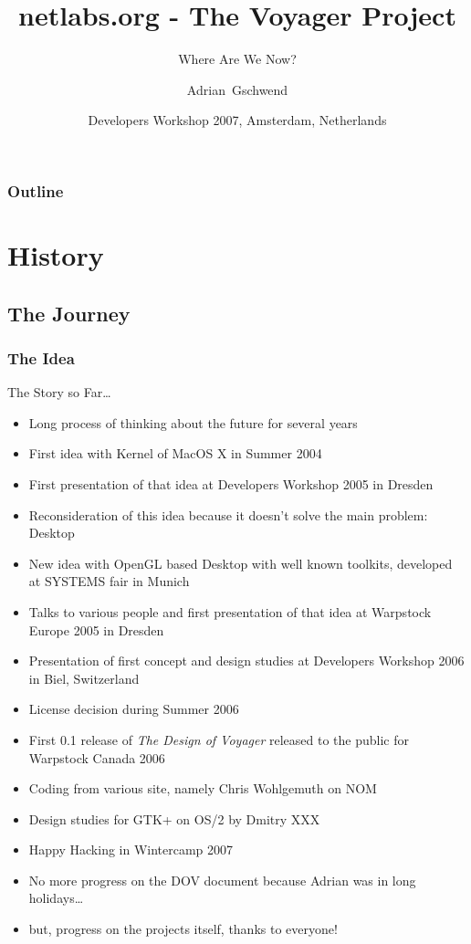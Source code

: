 \documentclass{beamer}
\title[netlabs.org - The Voyager Project]
{netlabs.org - The Voyager Project}
\subtitle
{Where Are We Now?}
\author[Adrian Gschwend]
{Adrian~Gschwend}
\institute[netlabs.org]
{
netlabs.org - Open Source Software
}
\date[07.07.2007]
{Developers Workshop 2007, Amsterdam, Netherlands}
\begin{document}
\begin{frame}
\titlepage
\end{frame}

\begin{frame}
\frametitle{Outline}
\tableofcontents[hideallsubsections]
\end{frame}

\section{History}

\subsection{The Journey}
\begin{frame}[allowframebreaks=0.6]
\frametitle{The Idea}
The Story so Far\ldots
\begin{itemize}
  \item Long process of thinking about the future for several years
  \item First idea with Kernel of MacOS X in Summer 2004
  \item First presentation of that idea at Developers Workshop 2005 in Dresden
  \item Reconsideration of this idea because it doesn't solve the main problem: Desktop
  \item New idea with OpenGL based Desktop with well known toolkits, developed at SYSTEMS fair in Munich
  \item Talks to various people and first presentation of that idea at
  Warpstock Europe 2005 in Dresden
  \item Presentation of first concept and design studies at Developers
  Workshop 2006 in Biel, Switzerland
  \item License decision during Summer 2006
  \item First 0.1 release of \textit{The Design of Voyager} released to the
  public for Warpstock Canada 2006
  \item Coding from various site, namely Chris Wohlgemuth on NOM
  \item Design studies for GTK+ on OS/2 by Dmitry XXX
  \item Happy Hacking in Wintercamp 2007
  \item No more progress on the DOV document because Adrian was in long holidays\ldots
  \item but, progress on the projects itself, thanks to everyone!
\end{itemize}
\end{frame}
\end{document}
